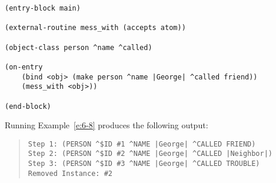 \begin{exampl}
\begin{verbatim}
(entry-block main)

(external-routine mess_with (accepts atom))

(object-class person ^name ^called)

(on-entry
    (bind <obj> (make person ^name |George| ^called friend))
    (mess_with <obj>))

(end-block)
\end{verbatim}
\label{e:6-8}
\end{exampl}

Running Example~\ref{e:6-8} produces the following output:

\begin{quote}
\begin{verbatim}
Step 1: (PERSON ^$ID #1 ^NAME |George| ^CALLED FRIEND)
Step 2: (PERSON ^$ID #2 ^NAME |George| ^CALLED |Neighbor|)
Step 3: (PERSON ^$ID #3 ^NAME |George| ^CALLED TROUBLE)
Removed Instance: #2
\end{verbatim}
\end{quote}

